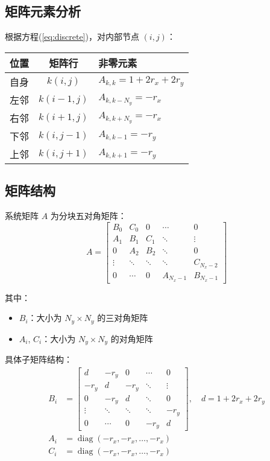 \documentclass{ctexart}
\begin{document}
\subsection{矩阵元素分析}
根据方程(\ref{eq:discrete})，对内部节点 $(i,j)$：
\begin{center}
\begin{tabular}{c|c|l}
位置 & 矩阵行 & 非零元素 \\
\midrule
自身 & $k(i,j)$ & $A_{k,k} = 1 + 2r_x + 2r_y$ \\
左邻 & $k(i-1,j)$ & $A_{k,k-N_y} = -r_x$ \\
右邻 & $k(i+1,j)$ & $A_{k,k+N_y} = -r_x$ \\
下邻 & $k(i,j-1)$ & $A_{k,k-1} = -r_y$ \\
上邻 & $k(i,j+1)$ & $A_{k,k+1} = -r_y$ \\
\end{tabular}
\end{center}

\subsection{矩阵结构}
系统矩阵 $A$ 为分块五对角矩阵：
\begin{equation}
A = \begin{bmatrix}
B_0 & C_0 & 0 & \cdots & 0 \\
A_1 & B_1 & C_1 & \ddots & \vdots \\
0 & A_2 & B_2 & \ddots & 0 \\
\vdots & \ddots & \ddots & \ddots & C_{N_x-2} \\
0 & \cdots & 0 & A_{N_x-1} & B_{N_x-1}
\end{bmatrix}
\end{equation}

其中：
\begin{itemize}
\item $B_i$：大小为 $N_y \times N_y$ 的三对角矩阵
\item $A_i$, $C_i$：大小为 $N_y \times N_y$ 的对角矩阵
\end{itemize}

具体子矩阵结构：
\begin{align}
B_i &= \begin{bmatrix}
d & -r_y & 0 & \cdots & 0 \\
-r_y & d & -r_y & \ddots & \vdots \\
0 & -r_y & d & \ddots & 0 \\
\vdots & \ddots & \ddots & \ddots & -r_y \\
0 & \cdots & 0 & -r_y & d
\end{bmatrix}, \quad d = 1 + 2r_x + 2r_y \\
A_i &= \operatorname{diag}(-r_x, -r_x, \dots, -r_x) \\
C_i &= \operatorname{diag}(-r_x, -r_x, \dots, -r_x)
\end{align}
\end{document}
